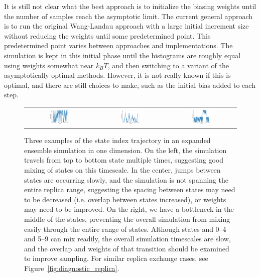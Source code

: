 \documentclass[9pt,review]{livecoms}
\begin{document}
It is still not clear what the best approach is to initialize the biasing weights until the number of samples reach the asymptotic limit.  The current general approach is to run the original Wang-Landau approach with a large initial increment size without reducing the weights until some predetermined point. This predetermined point varies between approaches and implementations.  The simulation is kept in this initial phase until the histograms are roughly equal using weights somewhat near $k_BT$, and then switching to a variant of the asymptotically optimal methods. However, it is not really known if this is optimal, and there are still choices to make, such as the initial bias added to each step.


\begin{figure}[!ht]
    \centering
\begin{tabular}{c|c|c}
\includegraphics[width=0.33\textwidth]{Figures/diagnostic_figures/goodmixing_exp.png} & \includegraphics[width=0.33\textwidth]{Figures/diagnostic_figures/slowmixing_exp.png}&
\includegraphics[width=0.33\textwidth]{Figures/diagnostic_figures/sepmixing_exp.png} 
\end{tabular}
    \caption{Three examples of the state index trajectory in an expanded ensemble simulation in one dimension. On the left, the simulation travels from top to bottom state multiple times, suggesting good mixing of states on this timescale.  In the center, jumps between states are occurring slowly, and the simulation is not spanning the entire replica range, suggesting the spacing between states may need to be decreased (i.e. overlap between states increased), or weights may need to be improved. On the right, we have a bottleneck in the middle of the states, preventing the overall simulation from mixing easily through the entire range of states. Although states and 0--4 and 5--9 can mix readily, the overall simulation timescales are slow, and the overlap and weights of that transition should be examined to improve sampling. For similar  replica exchange cases, see Figure~\ref{fig:diagnostic_replica}.}
    \label{fig:diagnostic_expanded}
\end{figure}
\end{document}

